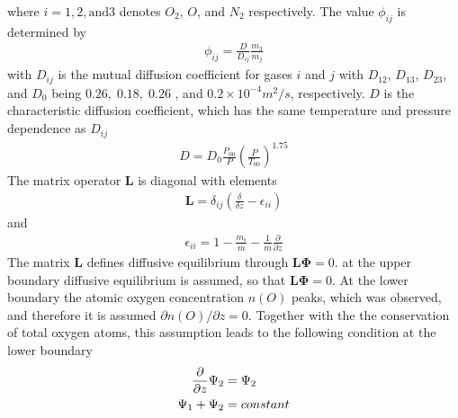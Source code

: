 %
where $i=1, 2, \text{and} 3$ denotes $O_2$, $O$, and $N_2$
respectively. The value $\phi_{ij}$ is determined by
%
\begin{align}
  \phi_{ij} = \frac{D}{D_{ij}}\frac{m_3}{m_j}
\end{align}
%
with $D_{ij}$ is the mutual diffusion coefficient for gases $i$ and
$j$ with $D_{12}$, $D_{13}$, $D_{23}$, and $D_0$ being $0.26, \;
0.18, \; 0.26$ \cite{colegrove1966}, and $0.2 \times 10^{-4} m^2/s$,
respectively.
%
$D$ is the characteristic diffusion coefficient, which has the same
temperature and pressure dependence as $D_{ij}$
%
\begin{align}
  D = D_0 \frac{P_{00}}{P}\left(\frac{P}{T_{00}} \right)^{1.75}
\end{align}
%
The matrix operator $\mathbf{L}$ is diagonal with elements
%
\begin{align}
  \mathbf{L}= \delta_{ij}\left( \frac{\delta}{\delta z} - \epsilon_{ii}\right)
\end{align}
%
and
%
\begin{align}
  \epsilon_{ii} = 1-\frac{m_i}{\overline{m}}-
  \frac{1}{\overline{m}}\frac{\partial}{\partial z}
\end{align}
%
The matrix $\mathbf{L}$ defines diffusive equilibrium through
$\mathbf{L}\mathbf{\Phi} = 0$. at the upper boundary diffusive
equilibrium is assumed, so that $\mathbf{L}\mathbf{\Phi} = 0$. At
the lower boundary the atomic oxygen concentration $n(O) $ peaks,
which was observed, and therefore it is assumed $\partial
n(O)/\partial z = 0$. Together with the the conservation of total
oxygen atoms, this assumption leads to the following condition at
the lower boundary
%
\begin{align}
   \frac{\partial}{\partial z}\Psi_2 & = \Psi_2 \notag \\
   \Psi_1 + \Psi_2 & = constant
\end{align}
%

